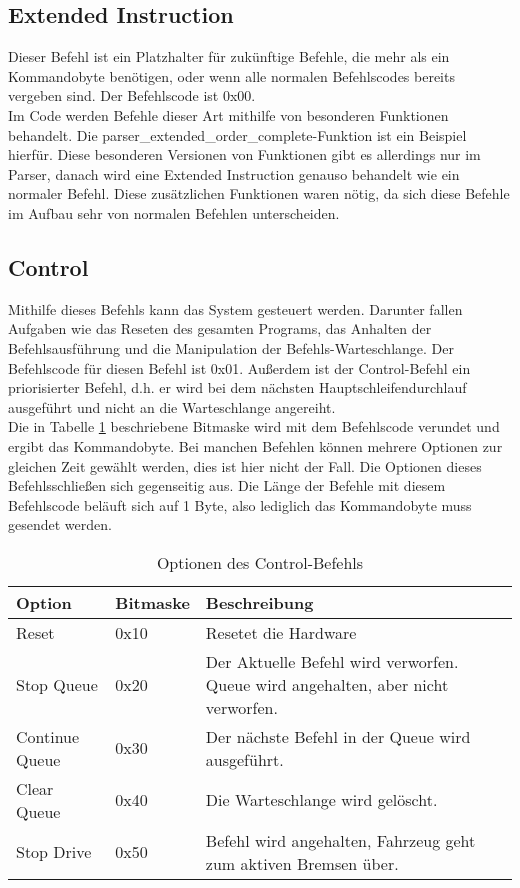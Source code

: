 \subsection{Extended Instruction}
Dieser Befehl ist ein Platzhalter für zukünftige Befehle, die mehr als ein Kommandobyte benötigen,
oder wenn alle normalen Befehlscodes bereits vergeben sind. Der Befehlscode ist 0x00.\\
Im Code werden Befehle dieser Art mithilfe von besonderen Funktionen behandelt. Die 
parser\_\-extended\_\-order\_\-complete-Funktion ist ein Beispiel hierfür. Diese
besonderen Versionen von Funktionen gibt es allerdings nur im Parser, danach wird eine Extended
Instruction genauso behandelt wie ein normaler Befehl. Diese zusätzlichen Funktionen
waren nötig, da sich diese Befehle im Aufbau sehr von normalen Befehlen unterscheiden.

\subsection{Control}
Mithilfe dieses Befehls kann das System gesteuert werden. Darunter fallen Aufgaben wie das
Reseten des gesamten Programs, das Anhalten der Befehlsausführung und die Manipulation
der Befehls-Warteschlange. Der Befehlscode für diesen Befehl ist 0x01. Außerdem ist der Control-Befehl
ein priorisierter Befehl, d.h. er wird bei dem nächsten Hauptschleifendurchlauf ausgeführt und nicht
an die Warteschlange angereiht.\\
Die in Tabelle \ref{protocol_control} beschriebene Bitmaske wird mit dem Befehlscode verundet
und ergibt das Kommandobyte. Bei manchen Befehlen können mehrere Optionen zur gleichen Zeit
gewählt werden, dies ist hier nicht der Fall. Die Optionen dieses Befehlsschließen sich
gegenseitig aus. Die Länge der Befehle mit diesem Befehlscode beläuft sich auf 1 Byte, also
lediglich das Kommandobyte muss gesendet werden.
\begin{table}[htb]
\begin{center}
	\begin{tabularx}{\linewidth}{|l|l|X|}
		\hline
		\textbf{Option} & \textbf{Bitmaske} & \textbf{Beschreibung} \\
		\hline
		\hline
		Reset 			& 0x10 				& Resetet die Hardware \\
		\hline
		Stop Queue		& 0x20				& Der Aktuelle Befehl wird verworfen. Queue wird angehalten, aber nicht verworfen. \\
		\hline
		Continue Queue	& 0x30				& Der nächste Befehl in der Queue wird ausgeführt. \\
		\hline
		Clear Queue		& 0x40				& Die Warteschlange wird gelöscht. \\
		\hline
		Stop Drive		& 0x50				& Befehl wird angehalten, Fahrzeug geht zum aktiven Bremsen über. \\
		\hline
	\end{tabularx}
	\caption{\label{protocol_control} Optionen des Control-Befehls}
\end{center}
\end{table}


